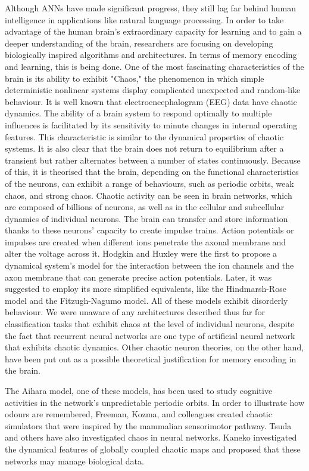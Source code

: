 \documentclass[runningheads]{llncs}
\begin{document}
Although ANNs have made significant progress, they still lag far behind human intelligence in applications like natural language processing. In order to take advantage of the human brain's extraordinary capacity for learning and to gain a deeper understanding of the brain, researchers are focusing on developing biologically inspired algorithms and architectures. In terms of memory encoding and learning, this is being done. One of the most fascinating characteristics of the brain is its ability to exhibit "Chaos," the phenomenon in which simple deterministic nonlinear systems display complicated unexpected and random-like behaviour. It is well known that electroencephalogram (EEG) data have chaotic dynamics. The ability of a brain system to respond optimally to multiple influences is facilitated by its sensitivity to minute changes in internal operating features. This characteristic is similar to the dynamical properties of chaotic systems. It is also clear that the brain does not return to equilibrium after a transient but rather alternates between a number of states continuously. Because of this, it is theorised that the brain, depending on the functional characteristics of the neurons, can exhibit a range of behaviours, such as periodic orbits, weak chaos, and strong chaos. Chaotic activity can be seen in brain networks, which are composed of billions of neurons, as well as in the cellular and subcellular dynamics of individual neurons. The brain can transfer and store information thanks to these neurons' capacity to create impulse trains. Action potentials or impulses are created when different ions penetrate the axonal membrane and alter the voltage across it. Hodgkin and Huxley were the first to propose a dynamical system's model for the interaction between the ion channels and the axon membrane that can generate precise action potentials. Later, it was suggested to employ its more simplified equivalents, like the Hindmarsh-Rose model and the Fitzugh-Nagumo model. All of these models exhibit disorderly behaviour. We were unaware of any architectures described thus far for classification tasks that exhibit chaos at the level of individual neurons, despite the fact that recurrent neural networks are one type of artificial neural network that exhibits chaotic dynamics. Other chaotic neuron theories, on the other hand, have been put out as a possible theoretical justification for memory encoding in the brain.\textbf{\\}

The Aihara model, one of these models, has been used to study cognitive activities in the network's unpredictable periodic orbits. In order to illustrate how odours are remembered, Freeman, Kozma, and colleagues created chaotic simulators that were inspired by the mammalian sensorimotor pathway. Tsuda and others have also investigated chaos in neural networks. Kaneko investigated the dynamical features of globally coupled chaotic maps and proposed that these networks may manage biological data. \textbf{\\}
\end{document}
